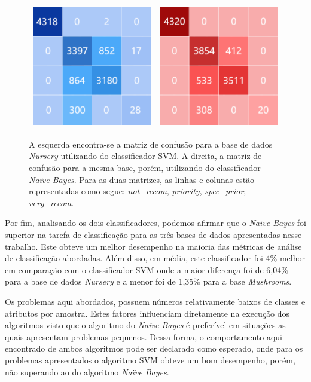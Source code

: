 \documentclass[12pt]{article}
\begin{document}
    \begin{figure}[h]
        \centering
        \begin{tabular}{c c}
            \includegraphics[width=.43\textwidth]{matrizconfusaosvm.png}&
            \includegraphics[width=.43\textwidth]{matrizconfusaobayes.png}
        \end{tabular}
        \caption{A esquerda encontra-se a matriz de confusão para a base de dados \textit{Nursery} utilizando do classificador SVM. A direita, a matriz de confusão para a mesma base, porém, utilizando do classificador \textit{Naïve Bayes}. Para as duas matrizes, as linhas e colunas estão representadas como segue: \textit{not\_recom}, \textit{priority}, \textit{spec\_prior}, \textit{very\_recom}.}
        \label{fig:matconfusao}
    \end{figure}

    Por fim, analisando os dois classificadores, podemos afirmar que o \textit{Naïve Bayes} foi superior na tarefa de classificação para as três bases de dados apresentadas nesse trabalho. Este obteve um melhor desempenho na maioria das métricas de análise de classificação abordadas.  Além disso, em média, este classificador foi 4\% melhor em comparação com o classificador SVM onde a maior diferença foi de 6,04\% para a base de dados \textit{Nursery} e a menor foi de 1,35\% para a base \textit{Mushrooms}.
    
    Os problemas aqui abordados, possuem números relativamente baixos de classes e atributos por amostra. Estes fatores influenciam diretamente na execução dos algoritmos visto que o algoritmo do \textit{Naïve Bayes} é preferível em situações as quais apresentam problemas pequenos. Dessa forma, o comportamento aqui encontrado de ambos algoritmos pode ser declarado como esperado, onde para os problemas apresentados o algoritmo SVM obteve um bom desempenho, porém, não superando ao do algoritmo \textit{Naïve Bayes}.
\end{document}
